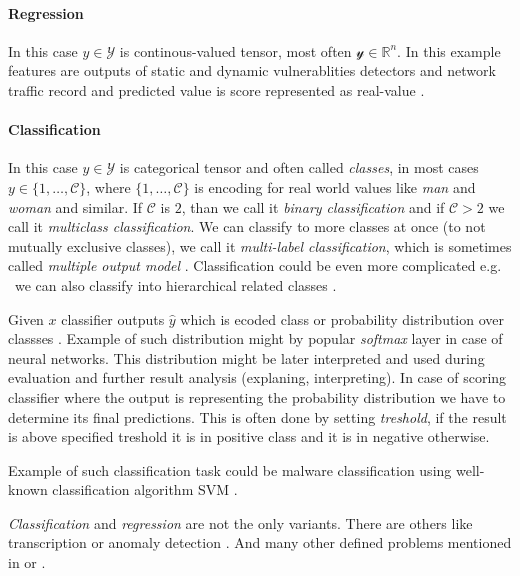 \paragraph{Regression}
In this case $y \in \mathcal{Y}$ is continous-valued tensor, most often $\mathcal{y} \in \mathbb{R}^{n}$. In this example features are outputs of static and dynamic vulnerablities detectors and network traffic record and predicted value is score represented as real-value \cite{Jaganathan2015}.

\paragraph{Classification}
In this case $y \in \mathcal{Y}$ is categorical tensor and often called \emph{classes}, in most cases $y \in \{1,\dots,\mathcal{C}\}$, where $\{1,\dots,\mathcal{C}\}$ is encoding for real world values like \emph{man} and \emph{woman} and similar. If $\mathcal{C}$ is $2$, than we call it \emph{binary classification} and if $\mathcal{C}>2$ we call it \emph{multiclass classification}. We can classify to more classes at once (to not mutually exclusive classes), we call it \emph{multi-label classification}, which is sometimes called \emph{multiple output model} \cite{murphy2013machine}. Classification could be even more complicated e.g. \ we can also classify into hierarchical related classes \cite{zhang2020dive}.

Given $x$ classifier outputs $\hat{y}$ which is ecoded class or probability distribution over classses \cite{GoodBengCour16}. Example of such distribution might by popular \emph{softmax} layer in case of neural networks. This distribution might be later interpreted and used during evaluation and further result analysis (explaning, interpreting). In case of scoring classifier where the output is representing the probability distribution we have to determine its final predictions. This is often done by setting \emph{treshold}, if the result is above specified treshold it is in positive class and it is in negative otherwise.

Example of such classification task could be malware classification using well-known classification algorithm SVM \cite{Kruczkowski2014}.

\emph{Classification} and \emph{regression} are not the only variants. There are others like transcription \cite{GoodBengCour16} or anomaly detection \cite{Chandola2009}. And many other defined problems mentioned in \cite{GoodBengCour16} or \cite{zhang2020dive}. 

